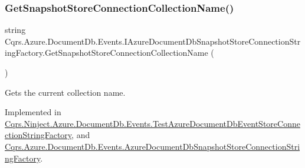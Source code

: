 \mbox{\label{interfaceCqrs_1_1Azure_1_1DocumentDb_1_1Events_1_1IAzureDocumentDbSnapshotStoreConnectionStringFactory_ad300bf0d143c3ad5d3bb1dfa22422645_ad300bf0d143c3ad5d3bb1dfa22422645}} 
\subsubsection{\texorpdfstring{Get\+Snapshot\+Store\+Connection\+Collection\+Name()}{GetSnapshotStoreConnectionCollectionName()}}
{\footnotesize\ttfamily string Cqrs.\+Azure.\+Document\+Db.\+Events.\+I\+Azure\+Document\+Db\+Snapshot\+Store\+Connection\+String\+Factory.\+Get\+Snapshot\+Store\+Connection\+Collection\+Name (\begin{DoxyParamCaption}{ }\end{DoxyParamCaption})}



Gets the current collection name. 



Implemented in \hyperlink{classCqrs_1_1Ninject_1_1Azure_1_1DocumentDb_1_1Events_1_1TestAzureDocumentDbEventStoreConnectionStringFactory_af6557ce689bd544454de70c97be4f216_af6557ce689bd544454de70c97be4f216}{Cqrs.\+Ninject.\+Azure.\+Document\+Db.\+Events.\+Test\+Azure\+Document\+Db\+Event\+Store\+Connection\+String\+Factory}, and \hyperlink{classCqrs_1_1Azure_1_1DocumentDb_1_1Events_1_1AzureDocumentDbSnapshotStoreConnectionStringFactory_a8b825aff585bc2ce4b5f24dd03548e8b_a8b825aff585bc2ce4b5f24dd03548e8b}{Cqrs.\+Azure.\+Document\+Db.\+Events.\+Azure\+Document\+Db\+Snapshot\+Store\+Connection\+String\+Factory}.

